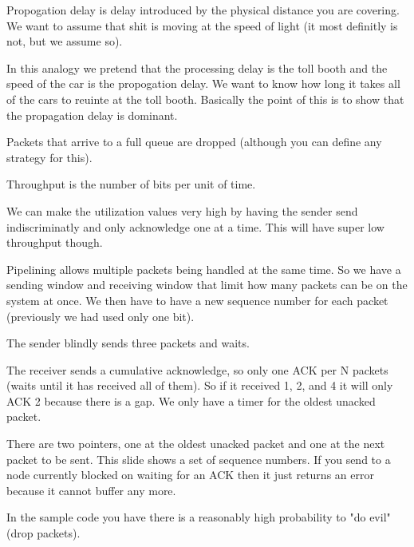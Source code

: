 \documentclass{article}
\begin{document}
Propogation delay is delay introduced by the physical distance you are covering. We want to assume that shit is moving at the speed of light (it most definitly is not, but we assume so).




In this analogy we pretend that the processing delay is the toll booth and the speed of the car is the propogation delay. We want to know how long it takes all of the cars to reuinte at the toll booth. Basically the point of this is to show that the propagation delay is dominant.





Packets that arrive to a full queue are dropped (although you can define any strategy for this). 

Throughput is the number of bits per unit of time. 







We can make the utilization values very high by having the sender send indiscriminatly and only acknowledge one at a time. This will have super low throughput though.


Pipelining allows multiple packets being handled at the same time. So we have a sending window and receiving window that limit how many packets can be on the system at once. We then have to have a new sequence number for each packet (previously we had used only one bit).


The sender blindly sends three packets and waits. 


The receiver sends a cumulative acknowledge, so only one ACK per N packets (waits until it has received all of them). So if it received 1, 2, and 4 it will only ACK 2 because there is a gap. We only have a timer for the oldest unacked packet.


There are two pointers, one at the oldest unacked packet and one at the next packet to be sent. This slide shows a set of sequence numbers. If you send to a node currently blocked on waiting for an ACK then it just returns an error because it cannot buffer any more.

In the sample code you have there is a reasonably high probability to "do evil" (drop packets).
\end{document}
